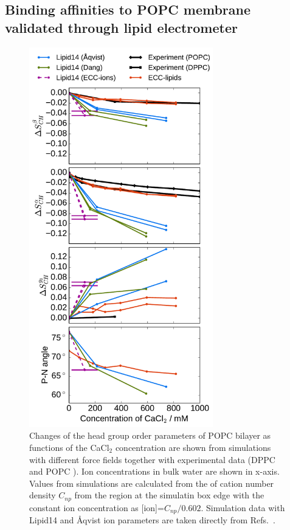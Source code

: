 \documentclass[aip,jcp,twocolumn]{revtex4}
\begin{document}
\subsection{Binding affinities to POPC membrane validated through lipid electrometer}

\begin{figure}[htb!]
  \centering
  \includegraphics[width=8.0cm]{../Fig/ipython_nb/PN_angle_OrdPars-A-B-g3_L14-ECCL17_q80_sig89_CaCl.pdf}
  \caption{\label{fig:delta_ordPar_CaCl}
    Changes of the head group order parameters of POPC bilayer as functions of the CaCl$_2$ concentration
    are shown from simulations with different force fields together with experimental data 
    (DPPC \cite{akutsu81} and POPC \cite{altenbach84}). 
    Ion concentrations in bulk water are shown in x-axis. 
    Values from simulations are calculated from the of cation number density $C_{np}$
    from the region at the simulatin box edge with the constant ion concentration as [ion]=$C_{np}/0.602$.
    Simulation data with Lipid14 and \AA{}qvist ion parameters are taken directly from
    Refs.~\cite{lipid14POPC0mMNaClfiles,lipid14POPC350mMCaClfiles,lipid14POPC350mMCaClfilesNC}.
  }
\end{figure}
\end{document}
